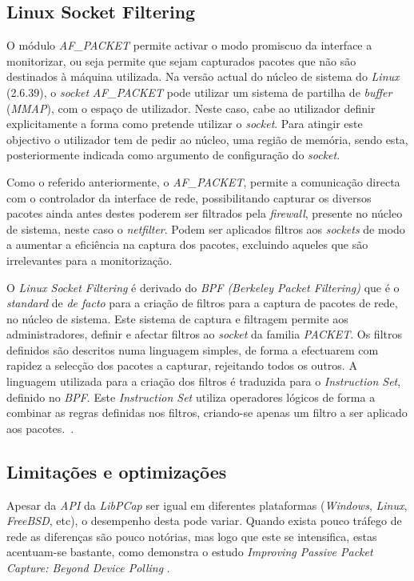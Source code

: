 \subsection{Linux Socket Filtering}



O módulo \textit{AF\_PACKET} permite activar o modo promiscuo da interface a monitorizar, ou seja permite que sejam capturados pacotes que não são destinados à máquina utilizada.
Na versão actual do núcleo de sistema do \textit{Linux} (2.6.39), o \textit{socket} \textit{AF\_PACKET} pode utilizar um sistema de partilha de \textit{buffer} (\textit{MMAP}), com o espaço de utilizador.
Neste caso, cabe ao utilizador definir explicitamente a forma como pretende utilizar o \textit{socket}. 
Para atingir este objectivo o utilizador tem de pedir ao núcleo, uma região de memória, sendo esta, posteriormente indicada como argumento de configuração do \textit{socket}.

Como o referido anteriormente, o \textit{AF\_PACKET}, permite a comunicação directa com o controlador da interface de rede, possibilitando capturar os diversos pacotes ainda antes destes poderem ser filtrados pela \textit{firewall}, presente no núcleo de sistema, neste caso o \textit{netfilter}.
Podem ser aplicados filtros aos \textit{sockets} de modo a aumentar a eficiência na captura dos pacotes, excluindo aqueles que são irrelevantes para a monitorização.

O \textit{Linux Socket Filtering} é derivado do \textit{BPF (Berkeley Packet Filtering)} que é o \textit{standard} de \textit{de facto} para a criação de filtros para a captura de pacotes de rede, no núcleo de sistema.
Este sistema de captura e filtragem permite aos administradores, definir e afectar filtros ao \textit{socket} da familia \textit{PACKET}.
Os filtros definidos são descritos numa linguagem simples, de forma a efectuarem com rapidez a selecção dos pacotes a capturar, rejeitando todos os outros.
A linguagem utilizada para a criação dos filtros é traduzida para o \textit{Instruction Set}, definido no \textit{BPF}.
Este \textit{Instruction Set} utiliza operadores lógicos de forma a combinar as regras definidas nos filtros, criando-se apenas um filtro a ser aplicado aos pacotes.~\cite{Mccanne92thebsd}.

\subsection{Limitações e optimizações}
Apesar da \textit{API} da \textit{LibPCap} ser igual em diferentes plataformas (\textit{Windows}, \textit{Linux}, \textit{FreeBSD}, etc), o desempenho desta pode variar.
Quando exista pouco tráfego de rede as diferenças são pouco notórias, mas logo que este se intensifica, estas acentuam-se bastante, como demonstra o estudo \textit{Improving Passive Packet Capture: Beyond Device Polling} \cite{Deri2004}.


